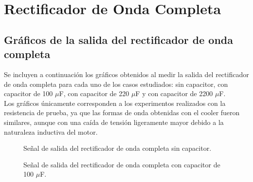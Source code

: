\section{Rectificador de Onda Completa}

\subsection{Gráficos de la salida del rectificador de onda completa}
Se incluyen a continuación los gráficos obtenidos al medir la salida del rectificador de onda completa para cada uno de los casos estudiados: sin capacitor, con capacitor de 100 $\mu$F, con capacitor de 220 $\mu$F y con capacitor de 2200 $\mu$F.\\
Los gráficos únicamente corresponden a los experimentos realizados con la resistencia de prueba, ya que las formas de onda obtenidas con el cooler fueron similares, aunque con una caída de tensión ligeramente mayor debido a la naturaleza inductiva del motor.

\begin{figure}[htbp]
    \centering
    \caption{Señal de salida del rectificador de onda completa sin capacitor.}
    \label{fig:onda_completa_sin_capacitor}
\end{figure}

\begin{figure}[htbp]
    \centering
    \caption{Señal de salida del rectificador de onda completa con capacitor de 100 $\mu$F.}
    \label{fig:onda_completa_capacitor_100u}
\end{figure}

